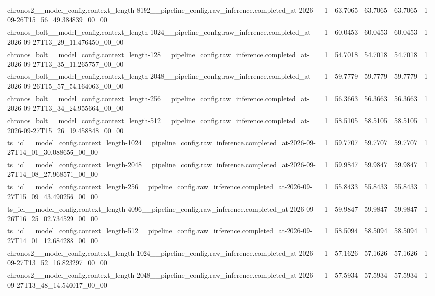 \begin{tabular}{llllll}
chronos2\_\_model\_config.context\_length-8192\_\_pipeline\_config.raw\_inference.completed\_at-2026-09-26T15\_56\_49.384839\_00\_00 & 1 & 63.7065 & 63.7065 & 63.7065 & 1 \\
chronos\_bolt\_\_model\_config.context\_length-1024\_\_pipeline\_config.raw\_inference.completed\_at-2026-09-27T13\_29\_11.476450\_00\_00 & 1 & 60.0453 & 60.0453 & 60.0453 & 1 \\
chronos\_bolt\_\_model\_config.context\_length-128\_\_pipeline\_config.raw\_inference.completed\_at-2026-09-27T13\_35\_11.265757\_00\_00 & 1 & 54.7018 & 54.7018 & 54.7018 & 1 \\
chronos\_bolt\_\_model\_config.context\_length-2048\_\_pipeline\_config.raw\_inference.completed\_at-2026-09-26T15\_57\_54.164063\_00\_00 & 1 & 59.7779 & 59.7779 & 59.7779 & 1 \\
chronos\_bolt\_\_model\_config.context\_length-256\_\_pipeline\_config.raw\_inference.completed\_at-2026-09-27T13\_34\_24.955664\_00\_00 & 1 & 56.3663 & 56.3663 & 56.3663 & 1 \\
chronos\_bolt\_\_model\_config.context\_length-512\_\_pipeline\_config.raw\_inference.completed\_at-2026-09-27T15\_26\_19.458848\_00\_00 & 1 & 58.5105 & 58.5105 & 58.5105 & 1 \\
ts\_icl\_\_model\_config.context\_length-1024\_\_pipeline\_config.raw\_inference.completed\_at-2026-09-27T14\_01\_30.088656\_00\_00 & 1 & 59.7707 & 59.7707 & 59.7707 & 1 \\
ts\_icl\_\_model\_config.context\_length-2048\_\_pipeline\_config.raw\_inference.completed\_at-2026-09-27T14\_08\_27.968571\_00\_00 & 1 & 59.9847 & 59.9847 & 59.9847 & 1 \\
ts\_icl\_\_model\_config.context\_length-256\_\_pipeline\_config.raw\_inference.completed\_at-2026-09-27T15\_09\_43.490256\_00\_00 & 1 & 55.8433 & 55.8433 & 55.8433 & 1 \\
ts\_icl\_\_model\_config.context\_length-4096\_\_pipeline\_config.raw\_inference.completed\_at-2026-09-26T16\_25\_02.734529\_00\_00 & 1 & 59.9847 & 59.9847 & 59.9847 & 1 \\
ts\_icl\_\_model\_config.context\_length-512\_\_pipeline\_config.raw\_inference.completed\_at-2026-09-27T14\_01\_12.684288\_00\_00 & 1 & 58.5094 & 58.5094 & 58.5094 & 1 \\
chronos2\_\_model\_config.context\_length-1024\_\_pipeline\_config.raw\_inference.completed\_at-2026-09-27T13\_52\_16.823297\_00\_00 & 1 & 57.1626 & 57.1626 & 57.1626 & 1 \\
chronos2\_\_model\_config.context\_length-2048\_\_pipeline\_config.raw\_inference.completed\_at-2026-09-27T13\_48\_14.546017\_00\_00 & 1 & 57.5934 & 57.5934 & 57.5934 & 1 \\

\end{tabular}
